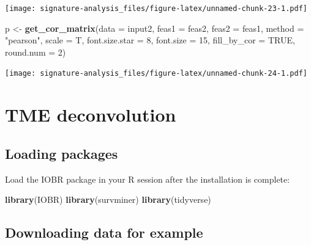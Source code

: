 \documentclass[
  12pt,
]{book}
\newenvironment{Shaded}{\begin{snugshade}}{\end{snugshade}}
\newcommand{\AttributeTok}[1]{\textcolor[rgb]{0.13,0.29,0.53}{#1}}
\newcommand{\ConstantTok}[1]{\textcolor[rgb]{0.56,0.35,0.01}{#1}}
\newcommand{\DecValTok}[1]{\textcolor[rgb]{0.00,0.00,0.81}{#1}}
\newcommand{\FunctionTok}[1]{\textcolor[rgb]{0.13,0.29,0.53}{\textbf{#1}}}
\newcommand{\NormalTok}[1]{#1}
\newcommand{\OtherTok}[1]{\textcolor[rgb]{0.56,0.35,0.01}{#1}}
\newcommand{\StringTok}[1]{\textcolor[rgb]{0.31,0.60,0.02}{#1}}
\begin{document}
\texttt{[image: signature-analysis\_files/figure-latex/unnamed-chunk-23-1.pdf]}

\begin{Shaded}
\begin{Highlighting}[]
\NormalTok{p }\OtherTok{\textless{}{-}} \FunctionTok{get\_cor\_matrix}\NormalTok{(}\AttributeTok{data           =}\NormalTok{ input2, }
                    \AttributeTok{feas1          =}\NormalTok{ feas2, }
                    \AttributeTok{feas2          =}\NormalTok{ feas1,}
                    \AttributeTok{method         =} \StringTok{"pearson"}\NormalTok{,}
                    \AttributeTok{scale          =}\NormalTok{ T, }
                    \AttributeTok{font.size.star =} \DecValTok{8}\NormalTok{, }
                    \AttributeTok{font.size      =} \DecValTok{15}\NormalTok{, }
                    \AttributeTok{fill\_by\_cor    =} \ConstantTok{TRUE}\NormalTok{, }
                    \AttributeTok{round.num      =} \DecValTok{2}\NormalTok{)}
\end{Highlighting}
\end{Shaded}

\texttt{[image: signature-analysis\_files/figure-latex/unnamed-chunk-24-1.pdf]}

\hypertarget{tme-deconvolution}{%
\chapter{\texorpdfstring{\textbf{TME deconvolution}}{TME deconvolution}}\label{tme-deconvolution}}

\hypertarget{loading-packages-3}{%
\section{Loading packages}\label{loading-packages-3}}

Load the IOBR package in your R session after the installation is complete:

\begin{Shaded}
\begin{Highlighting}[]
\FunctionTok{library}\NormalTok{(IOBR)}
\FunctionTok{library}\NormalTok{(survminer)}
\FunctionTok{library}\NormalTok{(tidyverse)}
\end{Highlighting}
\end{Shaded}

\hypertarget{downloading-data-for-example-2}{%
\section{Downloading data for example}\label{downloading-data-for-example-2}}
\end{document}
